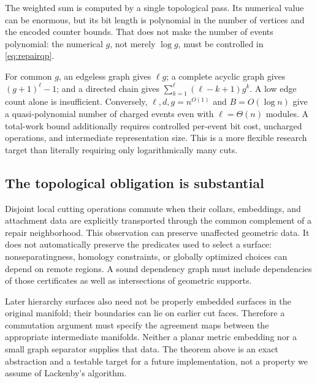 \documentclass[11pt]{article}
\theoremstyle{definition}
\theoremstyle{remark}
\begin{document}
The weighted sum is computed by a single topological pass. Its numerical value can be enormous, but its bit length is polynomial in the number of vertices and the encoded counter bounds. That does not make the number of events polynomial: the numerical $g$, not merely $\log g$, must be controlled in \eqref{eq:repairqp}.

For common $g$, an edgeless graph gives $\ell g$; a complete acyclic graph gives $(g+1)^\ell-1$; and a directed chain gives $\sum_{k=1}^{\ell}(\ell-k+1)g^k$. A low edge count alone is insufficient. Conversely, $\ell,d,g=n^{O(1)}$ and $B=O(\log n)$ give a quasi-polynomial number of charged events even with $\ell=\Theta(n)$ modules. A total-work bound additionally requires controlled per-event bit cost, uncharged operations, and intermediate representation size. This is a more flexible research target than literally requiring only logarithmically many cuts.

\subsection{The topological obligation is substantial}
Disjoint local cutting operations commute when their collars, embeddings, and attachment data are explicitly transported through the common complement of a repair neighborhood. This observation can preserve unaffected geometric data. It does not automatically preserve the predicates used to select a surface: nonseparatingness, homology constraints, or globally optimized choices can depend on remote regions. A sound dependency graph must include dependencies of those certificates as well as intersections of geometric supports.

Later hierarchy surfaces also need not be properly embedded surfaces in the original manifold; their boundaries can lie on earlier cut faces. Therefore a commutation argument must specify the agreement maps between the appropriate intermediate manifolds. Neither a planar metric embedding nor a small graph separator supplies that data. The theorem above is an exact abstraction and a testable target for a future implementation, not a property we assume of Lackenby's algorithm.
\end{document}
